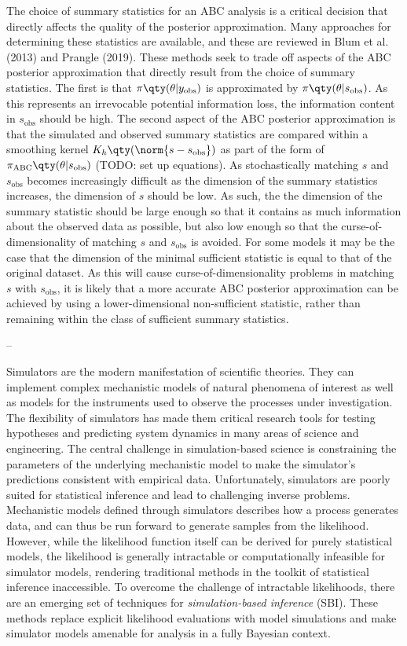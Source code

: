 The choice of summary statistics for an ABC analysis is a critical decision that directly affects the quality of the posterior approximation. Many approaches for determining these statistics are available, and these are reviewed in Blum et al. (2013) and Prangle (2019). These methods seek to trade off aspects of the ABC posterior approximation that directly result from the choice of summary statistics. The first is that $\pi \qty(\theta | y_\mathrm{obs})$ is approximated by $\pi \qty(\theta | s_\mathrm{obs})$. As this represents an irrevocable potential information loss, the information content in $s_\mathrm{obs}$ should be high. The second aspect of the ABC posterior approximation is that the simulated and observed summary statistics are compared within a smoothing kernel $K_h \qty(\norm{s - s_\mathrm{obs}})$ as part of the form of $\pi_\mathrm{ABC} \qty(\theta | s_\mathrm{obs})$ (TODO: set up equations). As stochastically matching $s$ and $s_\mathrm{obs}$ becomes increasingly difficult as the dimension of the summary statistics increases, the dimension of $s$ should be low. As such, the the dimension of the summary statistic should be large enough so that it contains as much information about the observed data as possible, but also low enough so that the curse-of-dimensionality of matching $s$ and $s_\mathrm{obs}$ is avoided. For some models it may be the case that the dimension of the minimal sufficient statistic is equal to that of the original dataset. As this will cause curse-of-dimensionality problems in matching $s$ with $s_\mathrm{obs}$, it is likely that a more accurate ABC posterior approximation can be achieved by using a lower-dimensional non-sufficient statistic, rather than remaining within the class of sufficient summary statistics.


--

Simulators are the modern manifestation of scientific theories. They can implement complex mechanistic models of natural phenomena of interest as well as models for the instruments used to observe the processes under investigation. The flexibility of simulators has made them critical research tools for testing hypotheses and predicting system dynamics in many areas of science and engineering. The central challenge in simulation-based science is constraining the parameters of the underlying mechanistic model to make the simulator's predictions consistent with empirical data. Unfortunately, simulators are poorly suited for statistical inference and lead to challenging inverse problems. Mechanistic models defined through simulators describes how a process generates data, and can thus be run forward to generate samples from the likelihood. However, while the likelihood function itself can be derived for purely statistical models, the likelihood is generally intractable or computationally infeasible for simulator models, rendering traditional methods in the toolkit of statistical inference inaccessible. To overcome the challenge of intractable likelihoods, there are an emerging set of techniques for \textit{simulation-based inference} (SBI). These methods replace explicit likelihood evaluations with model simulations and make simulator models amenable for analysis in a fully Bayesian context.

